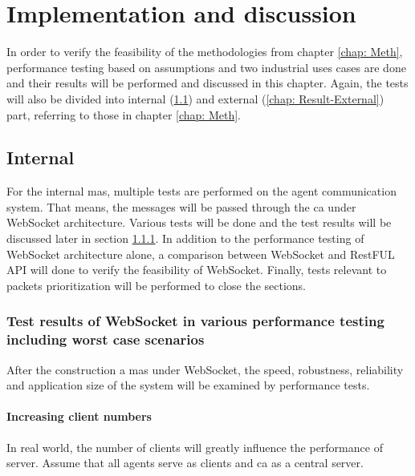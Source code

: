\chapter{Implementation and discussion} \label{chap: Result}

In order to verify the feasibility of the methodologies from chapter \ref{chap: Meth}, 
performance testing based on assumptions and two industrial uses cases 
are done and their results will be performed and discussed in this chapter. 
Again, the tests will also be divided into internal (\ref{chap: Result-Internal}) 
and external (\ref{chap: Result-External}) part, referring to those in chapter \ref{chap: Meth}.

\section{Internal}\label{chap: Result-Internal}
For the internal \gls{mas}, multiple tests are performed on the agent 
communication system. That means, the messages 
will be passed through the \gls{ca} under WebSocket architecture. 
Various tests will be done and the test results will be discussed later in section 
\ref{chap: Result-WS}. 
In addition to the performance testing of WebSocket architecture alone, 
a comparison between WebSocket and RestFUL API will done to verify the feasibility 
of WebSocket. 
Finally, tests relevant to packets prioritization will be performed to close 
the sections. 


\subsection{Test results of WebSocket in various performance testing including worst case scenarios} \label{chap: Result-WS}

After the construction a \gls{mas} under WebSocket, the speed, robustness, 
reliability and application size of the system will be examined by 
performance tests. 

\subsubsection{Increasing client numbers}
In real world, the number of clients will greatly influence the performance of 
server. Assume that all agents serve as clients and \gls{ca} as a central server. 
  



